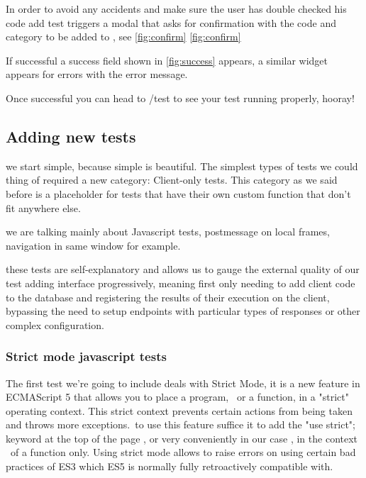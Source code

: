 In order to avoid any accidents and make sure the user has double checked his code add test triggers a modal that asks for confirmation with the code
and category to be added to , see \ref{fig:confirm} 
\ref{fig:confirm}

If successful a success field shown in \ref{fig:success} appears, a similar widget appears for errors with the error message.

Once successful you can head to /test to see your test running properly, hooray!

\subsection{Adding new tests}

we start simple, because simple is beautiful. The simplest types of tests we could thing of required a new category: Client-only tests.
This category as we said before is a placeholder for tests that have their own custom function that don't fit anywhere else.

we are talking mainly about Javascript tests, postmessage on local frames, navigation in same window for example.

these tests are self-explanatory and allows us to gauge the external quality of our test adding interface progressively, meaning first only needing
to add client code to the database and registering the results of their execution on the client, bypassing the need to setup endpoints with particular types
of responses or other complex configuration. 

\subsubsection{Strict mode javascript tests}

The first test we're going to include deals with Strict Mode, it is a new feature in ECMAScript 5 that allows you to place a program, \
or a function, in a "strict" operating context. This strict context prevents certain actions from being taken and throws more exceptions.\
to use this feature suffice it to add the  "use strict"; keyword at the top of the page , or very conveniently in our case , in the context \
of a function only. Using strict mode allows to raise errors on using certain bad practices of ES3 which ES5 is normally fully retroactively compatible with.\

